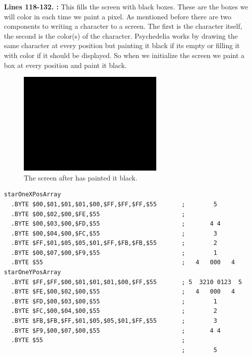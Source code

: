 \bigskip
\bigskip
\bigskip
\bigskip
\textbf{Lines 118-132. :} This fills the screen with black boxes. These are the boxes we will color in each time we paint a pixel.
As mentioned before there are two components to writing a character to a screen. The first is the character
itself, the second is the color(s) of the character. Psychedelia works by drawing the same character at every
position but painting it black if its empty or filling it with color if it should be displayed. So when
we initialize the screen we paint a box at every position and paint it black.

\begin{figure}[H]
    \centering
      \includegraphics[height=5cm]{src/listing_commentary/black.png}
  \caption*{The screen after  has painted it black.}
\end{figure}

\clearpage
\begin{lstlisting}
starOneXPosArray
  .BYTE $00,$01,$01,$01,$00,$FF,$FF,$FF,$55       ;        5       
  .BYTE $00,$02,$00,$FE,$55                       ;                
  .BYTE $00,$03,$00,$FD,$55                       ;       4 4      
  .BYTE $00,$04,$00,$FC,$55                       ;        3       
  .BYTE $FF,$01,$05,$05,$01,$FF,$FB,$FB,$55       ;        2       
  .BYTE $00,$07,$00,$F9,$55                       ;        1       
  .BYTE $55                                       ;   4   000   4  
starOneYPosArray
  .BYTE $FF,$FF,$00,$01,$01,$01,$00,$FF,$55       ; 5  3210 0123  5
  .BYTE $FE,$00,$02,$00,$55                       ;   4   000   4  
  .BYTE $FD,$00,$03,$00,$55                       ;        1       
  .BYTE $FC,$00,$04,$00,$55                       ;        2       
  .BYTE $FB,$FB,$FF,$01,$05,$05,$01,$FF,$55       ;        3       
  .BYTE $F9,$00,$07,$00,$55                       ;       4 4      
  .BYTE $55                                       ;                
                                                  ;        5       
\end{lstlisting}

